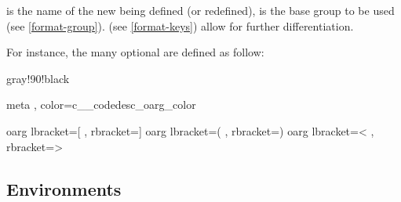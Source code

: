 \documentclass{article}
\begin{document}
\begin{codedescribe}[code,new=2023/05/16]{}
\begin{codesyntax} %
\end{codesyntax}
 is the name of the new  being defined (or redefined),
 is the base group to be used (see \ref{format-group}).  (see \ref{format-keys}) allow for further differentiation.
\end{codedescribe}
For instance, the many optional  are defined as follow:
\begin{codestore}
 { gray!90!black }

 { meta , color=c__codedesc_oarg_color }

 {oarg} { lbracket={[} , rbracket={]} }
 {oarg} { lbracket={(} , rbracket={)} }
 {oarg} { lbracket={<} , rbracket={>} }
\end{codestore}

\subsection{Environments}\label{desc-env}
\end{document}
